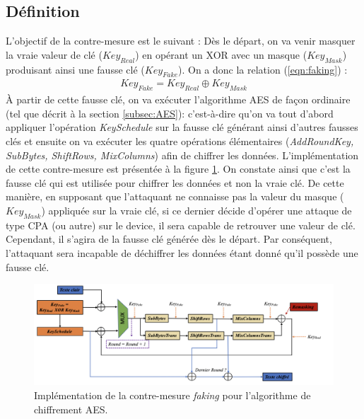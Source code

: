 \documentclass[oneside]{book}
\begin{document}
\subsection{Définition}
\label{subsec:def}

\hspace{-0.5 cm}L'objectif de la contre-mesure est le suivant : Dès le départ, on va venir masquer la vraie valeur de clé ($Key_{Real}$) en opérant un XOR avec un masque ($Key_{Mask}$) produisant ainsi une fausse clé ($Key_{Fake}$). On a donc la relation (\ref{eqn:faking}) : 
\begin{gather}
	Key_{Fake} = Key_{Real} \oplus Key_{Mask}\label{eqn:faking}
\end{gather}
À partir de cette fausse clé, on va exécuter l'algorithme AES de façon ordinaire (tel que décrit à la section \ref{subsec:AES}): c'est-à-dire qu'on va tout d'abord appliquer l'opération \textit{KeySchedule} sur la fausse clé générant ainsi d'autres fausses clés et ensuite on va exécuter les quatre opérations élémentaires (\textit{AddRoundKey, SubBytes, ShiftRows, MixColumns}) afin de chiffrer les données. L'implémentation de cette contre-mesure est présentée à la figure \ref{fig:ConceptFaking}. On constate ainsi que c'est la fausse clé qui est utilisée pour chiffrer les données et non la vraie clé. De cette manière, en supposant que l'attaquant ne connaisse pas la valeur du masque ($Key_{Mask}$) appliquée sur la vraie clé, si ce dernier décide d'opérer une attaque de type CPA (ou autre) sur le device, il sera capable de retrouver une valeur de clé. Cependant, il s'agira de la fausse clé générée dès le départ. Par conséquent, l'attaquant sera incapable de déchiffrer les données étant donné qu'il possède une fausse clé. \\

\begin{figure}[htbp]
    \hspace{-1.4cm}
    \includegraphics[scale=0.84]{image/ConceptFaking}
    \caption{Implémentation de la contre-mesure \textit{faking} pour l'algorithme de chiffrement AES.}
    \label{fig:ConceptFaking} 
\end{figure}
\end{document}
